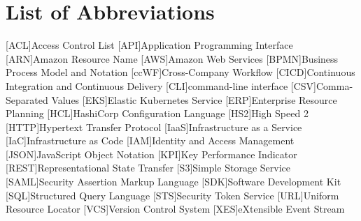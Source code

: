 \chapter*{List of Abbreviations}

\begin{acronym}[BPMN] %

	[ACL]{Access Control List}
	[API]{Application Programming Interface}
	[ARN]{Amazon Resource Name}
	[AWS]{Amazon Web Services}
	[BPMN]{Business Process Model and Notation}
	[ccWF]{Cross-Company Workflow}
	[CICD]{Continuous Integration and Continuous Delivery}
	[CLI]{command-line interface}
	[CSV]{Comma-Separated Values}
	[EKS]{Elastic Kubernetes Service}
	[ERP]{Enterprise Resource Planning}
	[HCL]{HashiCorp Configuration Language}
	[HS2]{High Speed 2}
	[HTTP]{Hypertext Transfer Protocol}
	[IaaS]{Infrastructure as a Service}
	[IaC]{Infrastructure as Code}
	[IAM]{Identity and Access Management}
	[JSON]{JavaScript Object Notation}
	[KPI]{Key Performance Indicator}
	[REST]{Representational State Transfer}
	[S3]{Simple Storage Service}
	[SAML]{Security Assertion Markup Language}
	[SDK]{Software Development Kit}
	[SQL]{Structured Query Language}
	[STS]{Security Token Service}
	[URL]{Uniform Resource Locator}
	[VCS]{Version Control System}
	[XES]{eXtensible Event Stream}

\end{acronym}
